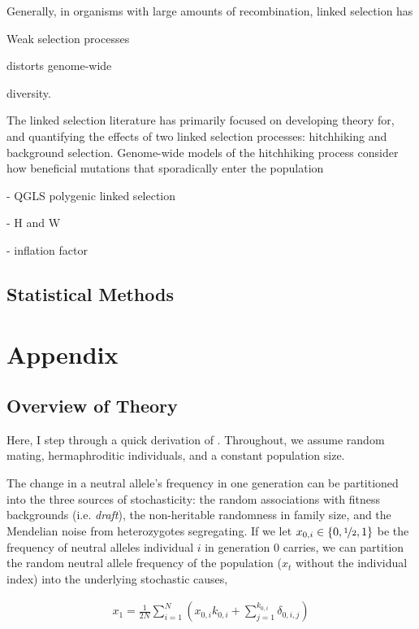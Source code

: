 \documentclass[11pt]{article}
\begin{document}
Generally, in organisms with large amounts of recombination, linked selection
has 


Weak selection processes 

distorts
genome-wide 

diversity.

The linked selection literature has primarily focused on developing theory for,
and quantifying the effects of two linked selection processes: hitchhiking and
background selection. Genome-wide models of the hitchhiking process consider
how beneficial mutations that sporadically enter the population 

- QGLS polygenic linked selection

- H and W

- inflation factor

\subsection*{Statistical Methods}

\section*{Appendix}

\subsection*{Overview of Theory}

Here, I step through a quick derivation of \textcite{Santiago1998-bs}.
Throughout, we assume random mating, hermaphroditic individuals, and a constant
population size. 

The change in a neutral allele's frequency in one generation can be partitioned
into the three sources of stochasticity: the random associations with fitness
backgrounds (i.e. \emph{draft}), the non-heritable randomness in family size,
and the Mendelian noise from heterozygotes segregating. If we let $x_{0,i} \in
\{0, \nicefrac{1}{2}, 1\}$ be the frequency of neutral alleles individual $i$
in generation 0 carries, we can partition the random neutral allele frequency
of the population ($x_t$ without the individual index) into the underlying
stochastic causes,

\begin{align}
  x_1 = \frac{1}{2N} \sum_{i=1}^N \left( x_{0,i}k_{0,i} + \sum_{j=1}^{k_{0,i}} \delta_{0,i,j} \right)
\end{align}
\end{document}
